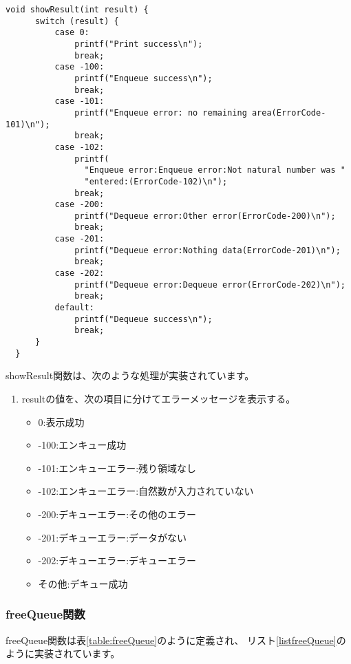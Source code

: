 \documentclass[a4j]{jarticle}
\begin{document}
\begin{lstlisting}[caption=リストキューのshowResult関数の実装,label=listlistshowResult]
  void showResult(int result) {
      switch (result) {
          case 0:
              printf("Print success\n");
              break;
          case -100:
              printf("Enqueue success\n");
              break;
          case -101:
              printf("Enqueue error: no remaining area(ErrorCode-101)\n");
              break;
          case -102:
              printf(
                "Enqueue error:Enqueue error:Not natural number was "
                "entered:(ErrorCode-102)\n");
              break;
          case -200:
              printf("Dequeue error:Other error(ErrorCode-200)\n");
              break;
          case -201:
              printf("Dequeue error:Nothing data(ErrorCode-201)\n");
              break;
          case -202:
              printf("Dequeue error:Dequeue error(ErrorCode-202)\n");
              break;
          default:
              printf("Dequeue success\n");
              break;
      }
  }
\end{lstlisting}

showResult関数は、次のような処理が実装されています。
\begin{enumerate}
  \item resultの値を、次の項目に分けてエラーメッセージを表示する。
        \begin{itemize}
          \item 0:表示成功
          \item -100:エンキュー成功
          \item -101:エンキューエラー:残り領域なし
          \item -102:エンキューエラー:自然数が入力されていない
          \item -200:デキューエラー:その他のエラー
          \item -201:デキューエラー:データがない
          \item -202:デキューエラー:デキューエラー
          \item その他:デキュー成功
        \end{itemize}
\end{enumerate}

\subsubsection{freeQueue関数}
freeQueue関数は表\ref{table:freeQueue}のように定義され、
リスト\ref{listfreeQueue}のように実装されています。
\end{document}
